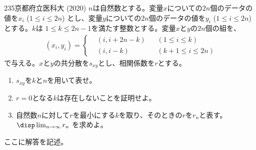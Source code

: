 \begin{prob}{235}{}{京都府立医科大 (2020)}
 $n$は自然数とする。変量$x$についての$2n$個のデータの値を$x_i$ ($1\le i\le 2n$) とし、変量$y$についての$2n$個のデータの値を$y_i$ ($1\le i\le 2n$) とする。$k$は $1\le k\le 2n-1$を満たす整数とする。変量$x$と$y$の$2n$個の組を、
 \begin{align*}
  (x_i,y_i)=\left\{
  \begin{aligned}
   &(i,i+2n-k) & &(1\le i\le k) \\
   &(i,i-k) & &(k+1\le i\le 2n)
  \end{aligned}
  \right.
 \end{align*}
 で与える。$x$と$y$の共分散を$s_{xy}$とし、相関係数を$r$とする。
 \begin{enumerate}
  \item $s_{xy}$を$k$と$n$を用いて表せ。
  \item $r=0$となる$k$は存在しないことを証明せよ。
  \item 自然数$n$に対して$r$を最小にする$k$を取り、そのときの$r$を$r_n$と表す。$\disp \lim_{n\to\infty} r_n$ を求めよ。
 \end{enumerate}
\end{prob}
ここに解答を記述。